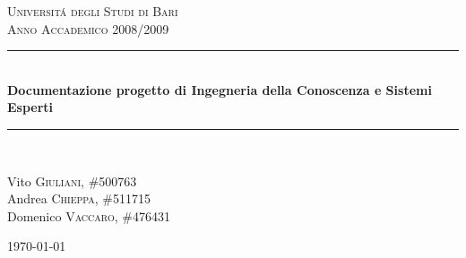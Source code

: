 \begin{titlepage}
\begin{center}

\author{Vito Giuliani}
\author{Andrea Chieppa}
\author{Domenico Vaccaro}

\textsc{\LARGE Universit\'a degli Studi di Bari}\\[2.5cm]

\textsc{\Large Anno Accademico 2008/2009}\\[1.0cm]

\rule{\linewidth}{0.2pt}\\[0.6cm]
{ \huge \bfseries Documentazione progetto di Ingegneria della Conoscenza e Sistemi Esperti }\\[0.4cm]
\rule{\linewidth}{0.2pt}\\[4.0cm]

\begin{center}
	Vito \textsc{Giuliani}, \#500763\\
	Andrea \textsc{Chieppa}, \#511715\\
	Domenico \textsc{Vaccaro}, \#476431\\
\end{center}

\vfill
{\large \today}

\end{center}
\end{titlepage}
